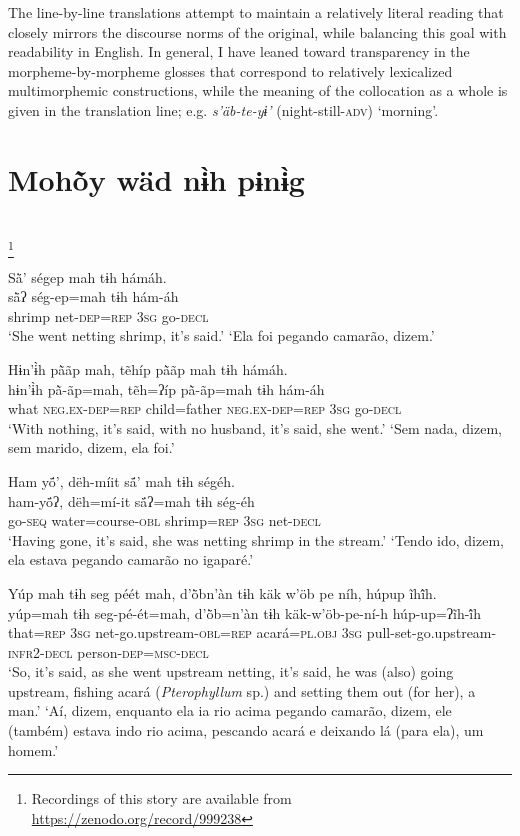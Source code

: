 \documentclass[output=paper,
modfonts,nonflat
]{langsci/langscibook}
\begin{document}
	The line-by-line translations attempt to maintain a relatively literal reading that closely mirrors the discourse norms of the original, while balancing this goal with readability in English. In general, I have leaned toward transparency in the morpheme-by-morpheme glosses that correspond to relatively lexicalized multimorphemic constructions, while the meaning of the collocation as a whole is given in the translation line; e.g. \textit{s’äb-te-yɨ’} (night-still\textsc{-adv}) ‘morning’.
    
\newpage
\section{Mohõ̀y wäd nɨ̀h pɨnɨ̀g}
\\
\footnote{Recordings of this story are available from  \url{https://zenodo.org/record/999238}}

\ea  Sä̀’ ségep mah tɨh hámáh.\\ 
\gll sä̀ʔ ség-ep=mah tɨh hám-áh\\
     shrimp net-\textsc{dep=rep} 3\textsc{sg} go-\textsc{decl}\\
\glt ‘She went netting shrimp, it’s said.'
\glt ‘Ela foi pegando camarão, dizem.'
\z 
 
\ea  Hɨn’ɨ̀h pã̀ãp mah, tẽhíp pã̀ãp mah tɨh hámáh.\\ 
\gll hɨn’ɨ̀h pã̀-ãp=mah, tẽh=ʔíp pã̀-ãp=mah tɨh hám-áh\\
     what \textsc{neg.ex-dep=rep} child=father \textsc{neg.ex-dep=rep} 3\textsc{sg} go-\textsc{decl}\\
\glt ‘With nothing, it’s said, with no husband, it’s said, she went.'
\glt ‘Sem nada, dizem, sem marido, dizem, ela foi.'
\z 

\ea  Ham yö́’, dëh-míit sä́’ mah tɨh ségéh.\\ 
\gll ham-yö́ʔ, dëh=mí-it sä́ʔ=mah tɨh ség-éh\\
     go\textsc{-seq} water=course\textsc{-obl} shrimp\textsc{=rep} \textsc{3sg} net\textsc{-decl}\\
\glt ‘Having gone, it’s said, she was netting shrimp in the stream.'
\glt ‘Tendo ido, dizem, ela estava pegando camarão no igaparé.'
\z 

\ea Yúp mah tɨh seg péét mah, d’ö̀bn’àn tɨh käk w’öb pe níh, húpup ĩhĩ́h.\\
\gll yúp=mah tɨh seg-pé-ét=mah, d’ö̀b=n’àn tɨh käk-w’öb-pe-ní-h húp-up=ʔĩh-ĩ́h\\ 
     that\textsc{=rep} \textsc{3sg} net-go.upstream\textsc{-obl=rep} acará\textsc{=pl.obj} \textsc{3sg} pull-set-go.upstream\textsc{-infr2-decl} person\textsc{-dep=msc-decl}\\
\glt ‘So, it’s said, as she went upstream netting, it’s said, he was (also) going upstream, fishing acará (\textit{Pterophyllum} sp.) and setting them out (for her), a man.'
\glt ‘Aí, dizem, enquanto ela ia rio acima pegando camarão, dizem, ele (também) estava indo rio acima, pescando acará e deixando lá (para ela), um homem.'
\z
\end{document}
